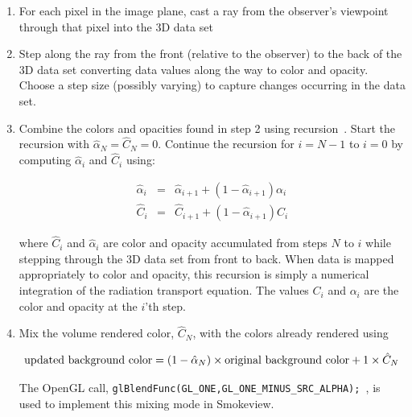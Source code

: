 \begin{enumerate}

\item For each pixel in the image plane, cast a ray from the observer's viewpoint through that pixel into the 3D data set

\item Step along the ray from the front (relative to the observer) to the back of the 3D data set converting data values along the way to color and opacity.  Choose a step size (possibly varying) to capture changes occurring in the data set.

\item
Combine the colors and opacities found in step 2 using recursion~\cite[Chapter 39]{gpugems}.
Start the recursion with $\hat{\alpha}_{N}=\hat{C}_{N}=0$. Continue the recursion for $i=N-1$ to $i=0$ by computing $\hat{\alpha}_i$ and $\hat{C}_i$ using:

\begin{eqnarray*}
\nonumber
\hat{\alpha}_i&=&\hat{\alpha}_{i+1}+\left(1-\hat{\alpha}_{i+1}\right)\alpha_i\\
\hat{C}_i&=&\hat{C}_{i+1}+\left(1-\hat{\alpha}_{i+1}\right)C_i
\end{eqnarray*}

where $\hat{C}_i$ and $\hat{\alpha}_i$ are color and opacity accumulated from steps $N$ to $i$ while stepping through the 3D data set from front to back.  When data is mapped appropriately to color and opacity, this recursion is simply a numerical integration of the radiation transport equation.
The values $C_i$ and $\alpha_i$ are the color and opacity at the $i$'th step.

\item Mix the volume rendered color, $\hat{C}_N$, with the colors already rendered using

\begin{eqnarray*}
\noindent\mbox{updated background color} = (1-\hat{\alpha}_N)\times \mbox{original background color} + 1\times\hat{C}_N
\end{eqnarray*}

The OpenGL call, {\tt   glBlendFunc(GL\_ONE,GL\_ONE\_MINUS\_SRC\_ALPHA); }, is used to implement this mixing mode in Smokeview.
\end{enumerate}


%
%

